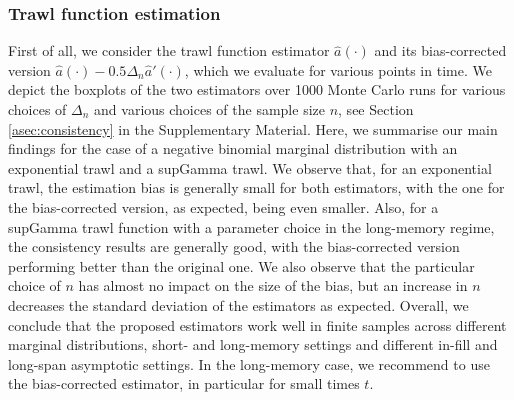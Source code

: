 \documentclass{article}
\theoremstyle{plain}
\theoremstyle{definition}
\theoremstyle{remark}
\begin{document}
\subsubsection{Trawl function estimation}
First of all, we consider the trawl function estimator $\widehat a(\cdot)$ and its bias-corrected version $\widehat a(\cdot)-0.5 \Delta_n \widehat a'(\cdot)$, which we evaluate for various points in time. We depict the boxplots of the two estimators over 1000 Monte Carlo runs for various choices of $\Delta_n$ and various choices of the sample size $n$, see Section \ref{asec:consistency} in the Supplementary Material. 
Here, we summarise our main findings for the case of a negative binomial marginal distribution with an exponential trawl and a supGamma trawl.
We observe that, for an exponential trawl, the estimation bias is generally small for both estimators, with the one for the bias-corrected version, as expected, being even smaller. 
Also, for a  supGamma trawl function with a parameter choice in the long-memory regime, the consistency results are generally good, with the bias-corrected version performing better than the original one. 
We also observe that the particular choice of $n$ has almost no impact on the size of the bias, but an increase in $n$ decreases the standard deviation of the estimators as expected.
Overall, we conclude that the proposed estimators work well in finite samples across different marginal distributions, short- and long-memory settings and different in-fill and long-span asymptotic settings.
In the long-memory case, we recommend to use the bias-corrected estimator, in particular for small times $t$.
\end{document}
